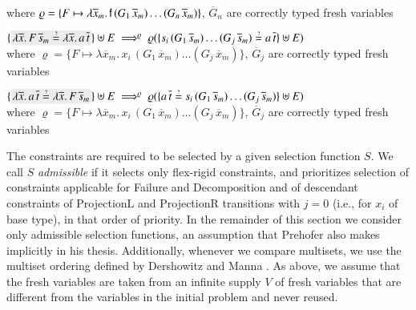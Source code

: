 \begin{description}[labelwidth=\widthof{\rm\unifrulename{Decomposition}}]
      where $\varrho = \{ F \mapsto \lambda \overline{x}_m. \, \mathsf{f} \, (G_1
      \, \overline{x}_m) \ldots (G_n \, \overline{x}_m) \}$,
      $\overline{G}_n$ are correctly typed fresh variables
    \item[\rm\textsf{ProjectionL}]
      $\{\selected{\lambda \overline{x}. \, F \, \overline{s}_m \unif \lambda
      \overline{x}. \, a \, \overline{t} }\} \uplus E \ptarrow{\varrho} 
      \varrho(\{ s_i \, (G_1 \,
      \overline{s}_m) \ldots (G_j \, \overline{s}_m) \unif a \, \overline{t}\} \uplus E)$ \\
      where $\varrho =\{F \mapsto \lambda \overline{x}_m. \, x_i \, (G_1 \,
      \overline{x}_m) \ldots (G_j \, \overline{x}_m)\}$, $\overline{G}_j$ are
      correctly typed fresh variables
    \item[\rm\textsf{ProjectionR}]
      $\{\selected{\lambda \overline{x}. \, a \, \overline{t} \unif \lambda \overline{x}. \, F \, \overline{s}_m }\} \uplus E \ptarrow{\varrho} 
      \varrho(\{ a \, \overline{t} \unif s_i \, (G_1 \,
      \overline{s}_m) \ldots (G_j \, \overline{s}_m)\} \uplus E)$ \\
      where $\varrho =\{F \mapsto \lambda \overline{x}_m. \, x_i \, (G_1 \,
      \overline{x}_m) \ldots (G_j \, \overline{x}_m)\}$, $\overline{G}_j$ are
      correctly typed fresh variables
\end{description}
\pagebreak[2]
The  constraints are required to be selected by a given
selection function $S$. We call $S$ \emph{admissible} if it selects only flex-rigid constraints, and prioritizes
selection of constraints applicable for \textsf{Failure} and \textsf{Decomposition} 
and of descendant constraints of
\textsf{ProjectionL} and \textsf{ProjectionR} transitions with $j=0$ (i.e., for $x_i$ of base type), in that order of priority. In the
remainder of this section we consider only admissible selection functions,
an assumption that Prehofer also makes implicitly in his thesis. Additionally,
whenever we compare multisets, we use the multiset ordering defined by
Dershowitz and Manna \cite{dm-79-multisetordering}.
As above, we assume that the fresh variables are taken from an infinite supply $V$ of fresh variables
that are different from the variables in the initial problem
and never reused.

